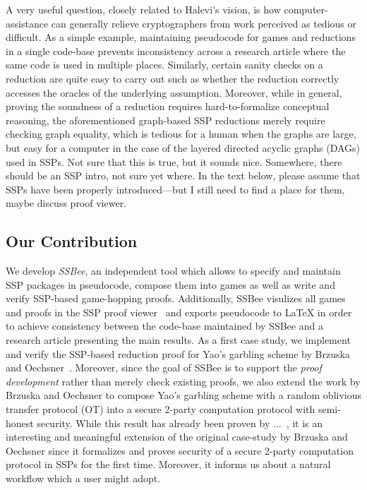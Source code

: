 A very useful question, closely related to Halevi's vision, is how
computer-assistance can generally relieve cryptographers from work perceived 
as tedious or difficult. %
As a simple example, maintaining pseudocode for games and reductions in a single 
code-base prevents inconsistency across a research article where the same code
is used in multiple places. Similarly, certain sanity checks on a reduction
are quite easy to carry out such as whether the reduction correctly accesses the
oracles of the underlying assumption. Moreover, while in general, proving the soundness of a reduction requires hard-to-formalize conceptual reasoning, the aforementioned graph-based SSP reductions merely require checking graph equality,
which is tedious for a human when the graphs are large, but easy for a computer in the case of the layered directed acyclic graphs (DAGs) used in SSPs. {\color{blue} Not sure that this is true, but it sounds nice. Somewhere, there should be an SSP intro, not sure yet where. In the text below, please assume that SSPs have been properly introduced---but I still need to find a place for them, maybe discuss proof viewer.}
\fi

\subsection{Our Contribution}
We develop \emph{SSBee}, an independent tool which allows to specify and maintain
SSP packages in pseudocode, compose them into games as well as write and verify
SSP-based game-hopping proofs. Additionally, SSBee visulizes all games and proofs in the SSP proof viewer~\cite{X} and exports pseudocode to LaTeX in order to achieve consistency between the code-base maintained by SSBee and a research article
presenting the main results. As a first case study, we implement and verify the SSP-based reduction proof for Yao's garbling scheme by Brzuska and Oechsner~\cite{X}. Moreover, since the goal of SSBee is to support the \emph{proof development} rather than merely check existing proofs, we also extend the work by Brzuska and Oechsner to compose Yao's garbling scheme with a random oblivious transfer protocol (OT) into a secure 2-party computation protocol with semi-honest security. While this result has already been proven by ...~\cite{X}, it is an interesting and meaningful extension of the original case-study by Brzuska and Oechsner since it formalizes and proves security of a secure 2-party computation protocol in SSPs for the first time. Moreover, it informs us about a natural workflow which a user might adopt.

